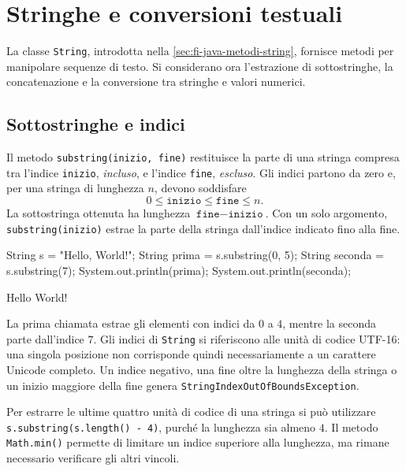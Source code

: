 \section{Stringhe e conversioni testuali}
\label{sec:fi-java-stringhe-operazioni}

La classe \texttt{String}, introdotta nella
\cref{sec:fi-java-metodi-string}, fornisce metodi per
manipolare sequenze di testo. Si considerano ora
l'estrazione di sottostringhe, la concatenazione e
la conversione tra stringhe e valori numerici.

\subsection{Sottostringhe e indici}
\label{sec:fi-java-substring}

Il metodo \texttt{substring(inizio, fine)} restituisce
la parte di una stringa compresa tra l'indice
\texttt{inizio}, \emph{incluso}, e l'indice
\texttt{fine}, \emph{escluso}. Gli indici partono
da zero e, per una stringa di lunghezza \(n\),
devono soddisfare
\[
  0 \leq \texttt{inizio} \leq \texttt{fine} \leq n.
\]
La sottostringa ottenuta ha lunghezza
\(\texttt{fine}-\texttt{inizio}\).
Con un solo argomento, \texttt{substring(inizio)}
estrae la parte della stringa dall'indice indicato
fino alla fine.

\begin{unipdcode}[language=Java]
String s = "Hello, World!";
String prima = s.substring(0, 5);
String seconda = s.substring(7);
System.out.println(prima);
System.out.println(seconda);
\end{unipdcode}

\begin{unipdterminal}
Hello
World!
\end{unipdterminal}

La prima chiamata estrae gli elementi con indici
da \(0\) a \(4\), mentre la seconda parte
dall'indice \(7\). Gli indici di \texttt{String}
si riferiscono alle unità di codice UTF-16:
una singola posizione non corrisponde quindi
necessariamente a un carattere Unicode completo.
Un indice negativo, una fine oltre la lunghezza
della stringa o un inizio maggiore della fine
genera \texttt{StringIndexOutOfBoundsException}.

Per estrarre le ultime quattro unità di codice
di una stringa si può utilizzare
\texttt{s.substring(s.length() - 4)}, purché
la lunghezza sia almeno \(4\). Il metodo
\texttt{Math.min()} permette di limitare un
indice superiore alla lunghezza, ma rimane
necessario verificare gli altri vincoli.


